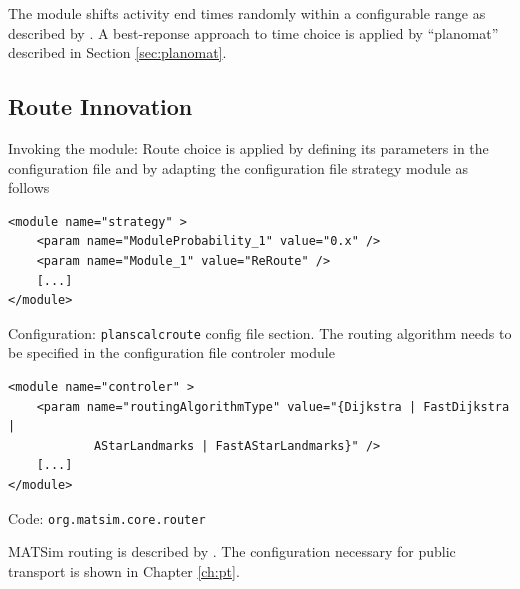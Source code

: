 The module shifts activity end times randomly within a configurable range as described by \citet[][]{BalmerEtAl_Timmermans_2005, Raney_PhDThesis_2005, Balmer_unpub_VSP_2004, BalmerEtAl_unpub_EIRASS_2004, BalmerEtAl_unpub_STRC_2004}. A best-reponse approach to time choice is applied by ``planomat'' described in Section \ref{sec:planomat}.

\subsection{Route Innovation}
\label{sec:routechoice}
\begin{compactitem}
\item Invoking the module: Route choice is applied by defining its parameters in the configuration file and by adapting the configuration file strategy module as follows
%
\begin{lstlisting}
<module name="strategy" >
    <param name="ModuleProbability_1" value="0.x" />
    <param name="Module_1" value="ReRoute" />
    [...]
</module>
\end{lstlisting}
%
\item Configuration: \lstinline|planscalcroute| config file section. The routing algorithm needs to be specified in the configuration file controler module
%
\begin{lstlisting}
<module name="controler" >
    <param name="routingAlgorithmType" value="{Dijkstra | FastDijkstra |
    		AStarLandmarks | FastAStarLandmarks}" />
    [...]
</module>
\end{lstlisting}
\item Code: \lstinline|org.matsim.core.router|
\end{compactitem}

MATSim routing is described by \citet[]{LefebvreBalmer_STRC_2007, LefebvreBalmer_TechRep_IVT_2007}. The configuration necessary for public transport is shown in Chapter \ref{ch:pt}.  

